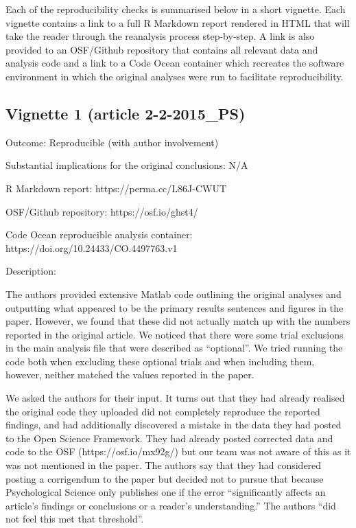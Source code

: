 \begin{appendix}
Each of the reproducibility checks is summarised below in a short
vignette. Each vignette contains a link to a full R Markdown report
rendered in HTML that will take the reader through the reanalysis
process step-by-step. A link is also provided to an OSF/Github
repository that contains all relevant data and analysis code and a link
to a Code Ocean container which recreates the software environment in
which the original analyses were run to facilitate reproducibility.

\hypertarget{vignette-1-article-2-2-2015_ps}{%
\subsection{Vignette 1 (article
2-2-2015\_PS)}\label{vignette-1-article-2-2-2015_ps}}

Outcome: Reproducible (with author involvement)

Substantial implications for the original conclusions: N/A

R Markdown report: https://perma.cc/L86J-CWUT

OSF/Github repository: https://osf.io/ghst4/

Code Ocean reproducible analysis container:
https://doi.org/10.24433/CO.4497763.v1

Description:

The authors provided extensive Matlab code outlining the original
analyses and outputting what appeared to be the primary results
sentences and figures in the paper. However, we found that these did not
actually match up with the numbers reported in the original article. We
noticed that there were some trial exclusions in the main analysis file
that were described as ``optional''. We tried running the code both when
excluding these optional trials and when including them, however,
neither matched the values reported in the paper.

We asked the authors for their input. It turns out that they had already
realised the original code they uploaded did not completely reproduce
the reported findings, and had additionally discovered a mistake in the
data they had posted to the Open Science Framework. They had already
posted corrected data and code to the OSF (https://osf.io/mx92g/) but
our team was not aware of this as it was not mentioned in the paper. The
authors say that they had considered posting a corrigendum to the paper
but decided not to pursue that because Psychological Science only
publishes one if the error ``significantly affects an article's findings
or conclusions or a reader's understanding.'' The authors ``did not feel
this met that threshold''.


\end{appendix}
